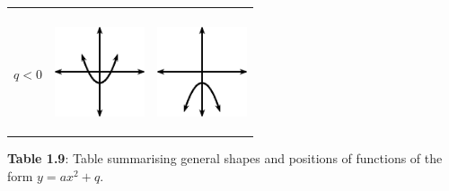 \begin{center}
\begin{xtabular*}{\mytablewidth}[t]{|p{10\mystarwidth}|p{10\mystarwidth}|p{10\mystarwidth}|}
\begin{center}
\vspace{2pt}
\vspace{.1in}
\end{center}    
\tabularnewline{}
    $q<0$
    &
\setcounter{subfigure}{0}
\label{m39345*id242017}
\begin{center}
\label{m39345*id242017!!!underscore!!!media}\label{m39345*id242017!!!underscore!!!printimage}\includegraphics[width=100px]{col11306.imgs/m39345_MG10C11_017.png} %
\vspace{2pt}
\vspace{.1in}
\end{center}    
    &
\setcounter{subfigure}{0}
\label{m39345*id242029}
\begin{center}
\label{m39345*id242029!!!underscore!!!media}\label{m39345*id242029!!!underscore!!!printimage}\includegraphics[width=100px]{col11306.imgs/m39345_MG10C11_018.png} %
\vspace{2pt}
\vspace{.1in}
\end{center}    
\tabularnewline{}
\end{xtabular*}
\end{center}
\begin{center}{\small\bfseries Table 1.9}: Table summarising general shapes and positions of functions of the form $y=a{x}^{2}+q$.\end{center}
\par
